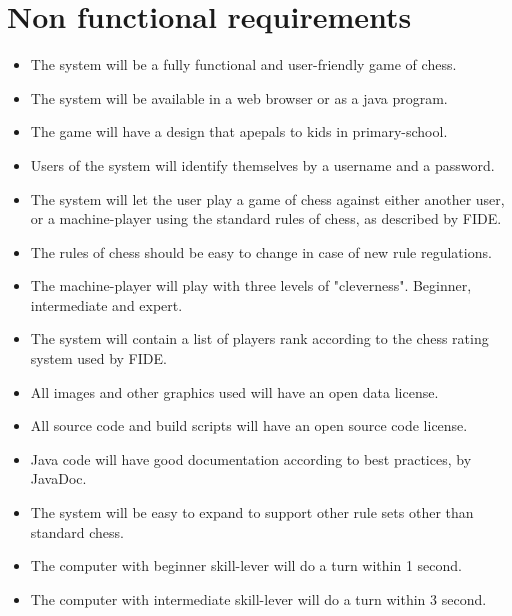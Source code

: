 \documentclass[norsk]{article}
\begin{document}
\begin{itemize}
\end{itemize}

\section{Non functional requirements}
\begin{itemize}
	\item 
	The system will be a fully functional and user-friendly game of chess. 
	\item 
	The system will be available in a web browser or as a java program.
	\item 
	The game will have a design that apepals to kids in primary-school.
	\item 
	Users of the system will identify themselves by a username and a password. 
	\item 
	The system will let the user play a game of chess against either another user, or a machine-player using the standard rules of chess, as described by FIDE.
	\item 
	The rules of chess should be easy to change in case of new rule regulations.
	\item 
	The machine-player will play with three levels of "cleverness". Beginner, intermediate and expert.
	\item 
	The system will contain a list of players rank according to the chess rating system used by FIDE.
	\item
	All images and other graphics used will have an open data license.
	\item
	All source code and build scripts will have an open source code license.
	\item
	Java code will have good documentation according to best practices, by JavaDoc.
	\item
	The system will be easy to expand to support other rule sets other than standard chess.
	\item
	The computer with beginner skill-lever will do a turn within 1 second.
	\item
	The computer with intermediate skill-lever will do a turn within 3 second.
	
	
\end{itemize}

 
\end{document}
